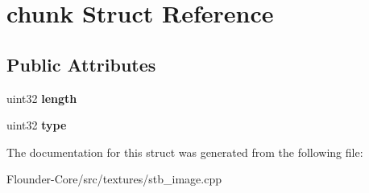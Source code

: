 \hypertarget{structchunk}{}\section{chunk Struct Reference}
\label{structchunk}
\subsection*{Public Attributes}
\begin{DoxyCompactItemize}
\item 
\mbox{\label{structchunk_a0b5cc0c5a9b91945c42373db2a499fb1}} 
uint32 {\bfseries length}
\item 
\mbox{\label{structchunk_a05d5489f3807bc7ba149c1904241d087}} 
uint32 {\bfseries type}
\end{DoxyCompactItemize}


The documentation for this struct was generated from the following file\+:\begin{DoxyCompactItemize}
\item 
Flounder-\/\+Core/src/textures/stb\+\_\+image.\+cpp\end{DoxyCompactItemize}
